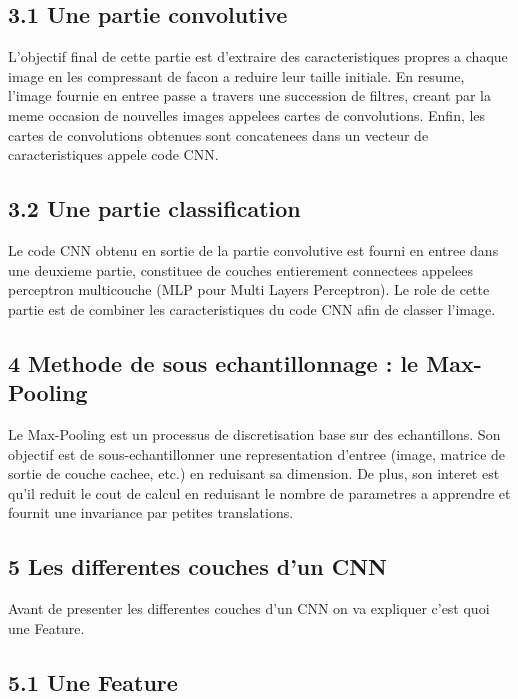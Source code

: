 \documentclass[]{article}
\begin{document}
\subsection{3.1 Une partie convolutive}\label{une-partie-convolutive}

L'objectif final de cette partie est d'extraire des caracteristiques
propres a chaque image en les compressant de facon a reduire leur taille
initiale. En resume, l'image fournie en entree passe a travers une
succession de filtres, creant par la meme occasion de nouvelles images
appelees cartes de convolutions. Enfin, les cartes de convolutions
obtenues sont concatenees dans un vecteur de caracteristiques appele
code CNN.

\subsection{3.2 Une partie
classification}\label{une-partie-classification}

Le code CNN obtenu en sortie de la partie convolutive est fourni en
entree dans une deuxieme partie, constituee de couches entierement
connectees appelees perceptron multicouche (MLP pour Multi Layers
Perceptron). Le role de cette partie est de combiner les
caracteristiques du code CNN afin de classer l'image.

\subsection{4 Methode de sous echantillonnage : le
Max-Pooling}\label{methode-de-sous-echantillonnage-le-max-pooling}

Le Max-Pooling est un processus de discretisation base sur des
echantillons. Son objectif est de sous-echantillonner une representation
d'entree (image, matrice de sortie de couche cachee, etc.) en reduisant
sa dimension. De plus, son interet est qu'il reduit le cout de calcul en
reduisant le nombre de parametres a apprendre et fournit une invariance
par petites translations.

\subsection{5 Les differentes couches d'un
CNN}\label{les-differentes-couches-dun-cnn}

Avant de presenter les differentes couches d'un CNN on va expliquer
c'est quoi une Feature.

\subsection{5.1 Une Feature}\label{une-feature}
\end{document}
